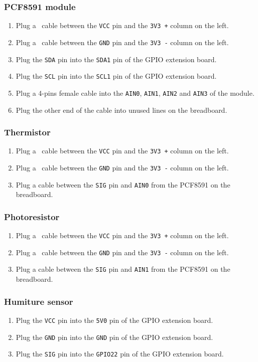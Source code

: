 \documentclass[11pt,a4paper]{article}
\newcommand{\plugmodule}[2]{Plug the \texttt{#1} pin into the \texttt{#2} pin of the GPIO extension board.}
\newcommand{\plugcolumn}[4]{Plug a {#1\def\temp{#1}\ifx\temp\empty\else\ \fi}cable between the \texttt{#2} pin and the \texttt{#3} column on the #4.}
\begin{document}
\subsubsection{PCF8591 module}

\begin{enumerate}
  \item	\plugcolumn{}{VCC}{3V3 +}{left}
  \item \plugcolumn{}{GND}{3V3 -}{left}
  \item	\plugmodule{SDA}{SDA1}
  \item	\plugmodule{SCL}{SCL1}
  \item Plug a 4-pins female cable into the \texttt{AIN0}, \texttt{AIN1}, \texttt{AIN2} and \texttt{AIN3} of the module.
  \item Plug the other end of the cable into unused lines on the breadboard.
\end{enumerate}

\subsubsection{Thermistor}

\begin{enumerate}
  \item	\plugcolumn{}{VCC}{3V3 +}{left}
  \item \plugcolumn{}{GND}{3V3 -}{left}
  \item Plug a cable between the \texttt{SIG} pin and \texttt{AIN0} from the PCF8591 on the breadboard.
\end{enumerate}

\subsubsection{Photoresistor}

\begin{enumerate}
  \item	\plugcolumn{}{VCC}{3V3 +}{left}
  \item \plugcolumn{}{GND}{3V3 -}{left}
  \item	Plug a cable between the \texttt{SIG} pin and \texttt{AIN1} from the PCF8591 on the breadboard.
\end{enumerate}

\subsubsection{Humiture sensor}

\begin{enumerate}
  \item	\plugmodule{VCC}{5V0}
  \item \plugmodule{GND}{GND}
  \item	\plugmodule{SIG}{GPIO22}
\end{enumerate}
\end{document}
